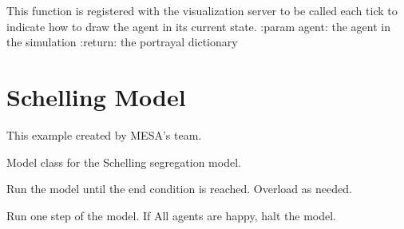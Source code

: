 \documentclass[letterpaper,10pt,english]{sphinxmanual}
\begin{document}
\begin{fulllineitems}
\label{\detokenize{index:examples.pd_grid.pd_grid.portrayal.portrayPDAgent}}
This function is registered with the visualization server to be called
each tick to indicate how to draw the agent in its current state.
:param agent:  the agent in the simulation
:return: the portrayal dictionary

\end{fulllineitems}

\label{\detokenize{index:module-examples.pd_grid.pd_grid.server}}\label{\detokenize{index:module-examples.schelling.model}}

\chapter{Schelling Model}
\label{\detokenize{index:schelling-model}}
This example created by MESA’s team.

\begin{fulllineitems}
\label{\detokenize{index:examples.schelling.model.Schelling}}
Model class for the Schelling segregation model.

\begin{fulllineitems}
\label{\detokenize{index:examples.schelling.model.Schelling.run_model}}
Run the model until the end condition is reached. Overload as
needed.

\end{fulllineitems}


\begin{fulllineitems}
\label{\detokenize{index:examples.schelling.model.Schelling.step}}
Run one step of the model. If All agents are happy, halt the model.

\end{fulllineitems}


\end{fulllineitems}
\end{document}
